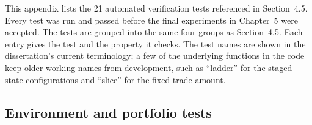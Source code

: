 
This appendix lists the 21 automated verification tests referenced in
Section~4.5. Every test was run and passed before the final experiments
in Chapter~5 were accepted. The tests are grouped into the same four
groups as Section~4.5. Each entry gives the test and the property it
checks. The test names are shown in the dissertation's current
terminology; a few of the underlying functions in the code keep older
working names from development, such as ``ladder'' for the staged state
configurations and ``slice'' for the fixed trade amount.

\subsection*{Environment and portfolio tests}

